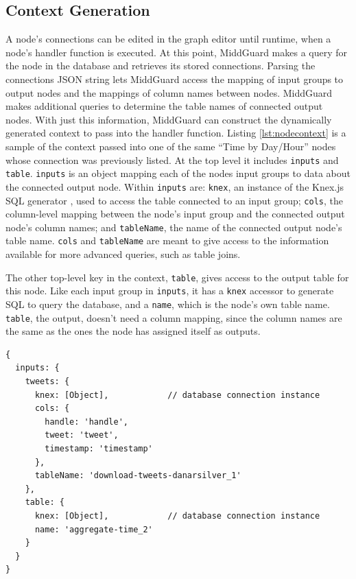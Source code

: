 \documentclass[midd]{thesis}
\begin{document}
\subsection{Context Generation}

A node's connections can be edited in the graph editor until runtime, when a
node's handler function is executed. At this point, MiddGuard makes a query for
the node in the database and retrieves its stored connections. Parsing the
connections JSON string lets MiddGuard access the mapping of input groups to
output nodes and the mappings of column names between nodes. MiddGuard makes
additional queries to determine the table names of connected output nodes. With
just this information, MiddGuard can construct the dynamically generated context
to pass into the handler function. Listing \ref{lst:nodecontext} is a sample of
the context passed into one of the same ``Time by Day/Hour'' nodes whose
connection was previously listed. At the top level it includes \texttt{inputs}
and \texttt{table}. \texttt{inputs} is an object mapping each of the nodes input
groups to data about the connected output node. Within \texttt{inputs} are:
\texttt{knex}, an instance of the Knex.js SQL generator \cite{knexjs}, used to
access the table connected to an input group; \texttt{cols}, the column-level
mapping between the node's input group and the connected output node's column
names; and \texttt{tableName}, the name of the connected output node's table
name. \texttt{cols} and \texttt{tableName} are meant to give access to the
information available for more advanced queries, such as table joins.

The other top-level key in the context, \texttt{table}, gives access to the
output table for this node. Like each input group in \texttt{inputs}, it has a
\texttt{knex} accessor to generate SQL to query the database, and a
\texttt{name}, which is the node's own table name. \texttt{table}, the output,
doesn't need a column mapping, since the column names are the same as the ones
the node has assigned itself as outputs.

\begin{lstlisting}[caption={The context passed into a ``Time by Day/Hour'' node's handler function.}, captionpos=b, label={lst:nodecontext}]
{
  inputs: {
    tweets: {
      knex: [Object],            // database connection instance
      cols: {
        handle: 'handle',
        tweet: 'tweet',
        timestamp: 'timestamp'
      },
      tableName: 'download-tweets-danarsilver_1'
    },
    table: {
      knex: [Object],            // database connection instance
      name: 'aggregate-time_2'
    }
  }
}
\end{lstlisting}
\end{document}
